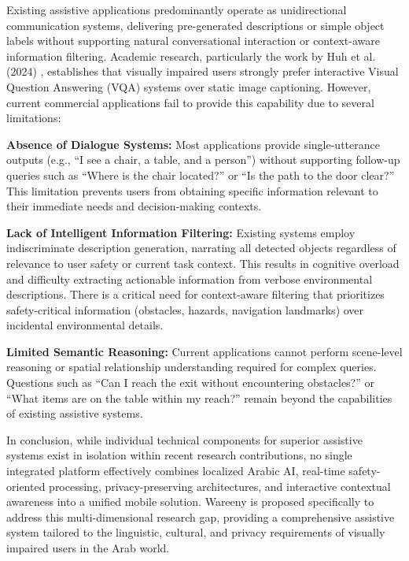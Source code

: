 \documentclass[a4paper]{report}
\begin{document}
Existing assistive applications predominantly operate as unidirectional communication systems, delivering pre-generated descriptions or simple object labels without supporting natural conversational interaction or context-aware information filtering. Academic research, particularly the work by Huh et al. (2024) \cite{huh2024longform}, establishes that visually impaired users strongly prefer interactive Visual Question Answering (VQA) systems over static image captioning. However, current commercial applications fail to provide this capability due to several limitations:

\textbf{Absence of Dialogue Systems:} Most applications provide single-utterance outputs (e.g., ``I see a chair, a table, and a person'') without supporting follow-up queries such as ``Where is the chair located?'' or ``Is the path to the door clear?'' This limitation prevents users from obtaining specific information relevant to their immediate needs and decision-making contexts.

\textbf{Lack of Intelligent Information Filtering:} Existing systems employ indiscriminate description generation, narrating all detected objects regardless of relevance to user safety or current task context. This results in cognitive overload and difficulty extracting actionable information from verbose environmental descriptions. There is a critical need for context-aware filtering that prioritizes safety-critical information (obstacles, hazards, navigation landmarks) over incidental environmental details.

\textbf{Limited Semantic Reasoning:} Current applications cannot perform scene-level reasoning or spatial relationship understanding required for complex queries. Questions such as ``Can I reach the exit without encountering obstacles?'' or ``What items are on the table within my reach?'' remain beyond the capabilities of existing assistive systems.

In conclusion, while individual technical components for superior assistive systems exist in isolation within recent research contributions, no single integrated platform effectively combines localized Arabic AI, real-time safety-oriented processing, privacy-preserving architectures, and interactive contextual awareness into a unified mobile solution. Wareeny is proposed specifically to address this multi-dimensional research gap, providing a comprehensive assistive system tailored to the linguistic, cultural, and privacy requirements of visually impaired users in the Arab world.
\end{document}
